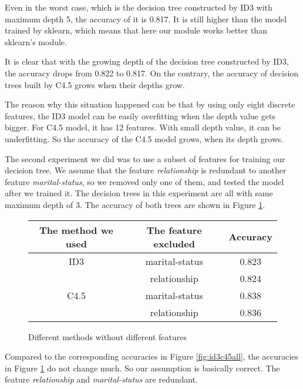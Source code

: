 \documentclass[a4paper]{article}
\begin{document}
Even in the worst case, which is the decision tree constructed by ID3 with maximum depth 5, the accuracy of it is 0.817. It is still higher than the model trained by sklearn, which means that here our module works better than sklearn's module.

It is clear that with the growing depth of the decision tree constructed by ID3, the accuracy drops from 0.822 to 0.817. On the contrary, the accuracy of decision trees built by C4.5 grows when their depths grow.

The reason why this situation happened can be that by using only eight discrete features, the ID3 model can be easily overfitting when the depth value gets bigger. For C4.5 model, it has 12 features. With small depth value, it can be underfitting. So the accuracy of the C4.5 model grows, when its depth grows.

The second experiment we did was to use a subset of features for training our decision tree. We assume that the feature \emph{relationship} is redundant to another feature \emph{marital-status}, so we removed only one of them, and tested the model after we trained it. The decision trees in this experiment are all with same maximum depth of 3. The accuracy of both trees are shown in Figure \ref{fig:id3c45second}.

\begin{figure}[h]
    \centering
    	\begin{tabular}{c|c|c}
        The method we used & The feature excluded & Accuracy \\
        \hline
        ID3 &marital-status& 0.823\\
        & relationship & 0.824\\
        \hline
        C4.5 &marital-status& 0.838\\
        &relationship &0.836\\
        \end{tabular}
    \caption{Different methods without different features}
    \label{fig:id3c45second}
 \end{figure}

Compared to the corresponding accuracies in Figure \ref{fig:id3c45all}, the accuracies in Figure \ref{fig:id3c45second} do not change much. So our assumption is basically correct. The feature \emph{relationship} and \emph{marital-status} are redundant.
\end{document}
